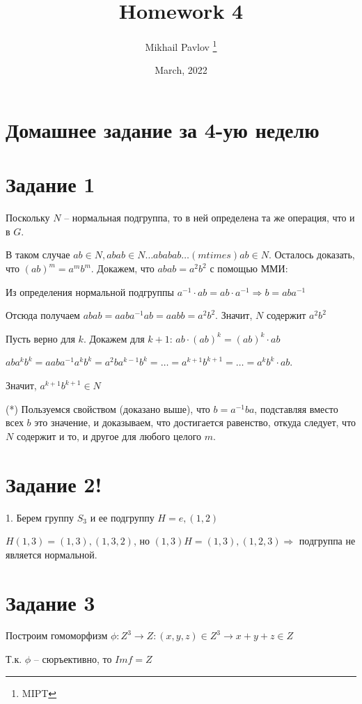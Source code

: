 \documentclass[12pt, a4paper]{article}
\title{Homework 4}
\author{Mikhail Pavlov \thanks{MIPT}}
\date{March, 2022}
\theoremstyle{definition}
\begin{document}
    \section{Домашнее задание за 4-ую неделю}

    \section*{Задание 1}

        Поскольку $N$ -- нормальная подгруппа, то в ней определена та же операция, что и в $G$.

        В таком случае $ab \in N, abab \in N \dots ababab\dots(m times)ab \in N$. Осталось доказать, что $(ab)^m = a^mb^m$.
        Докажем, что $abab = a^2 b^2$ с помощью ММИ:

        Из определения нормальной подгруппы $a^{-1} \cdot ab = ab \cdot a^{-1} \Rightarrow b = aba^{-1}$

        Отсюда получаем $abab = aaba^{-1}ab = aabb = a^{2} b^2$. Значит, $N$ содержит $a^2 b^2$

        Пусть верно для $k$. Докажем для $k + 1$: $ab \cdot (ab)^k = (ab)^k \cdot ab$

        $ab a^k b^k = a aba^{-1} a^k b^k = a^2 b a^{k-1} b^k = \dots = a^{k+1}b^{k+1} = \dots = a^k b^k \cdot ab$.

        Значит, $a^{k+1} b^{k+1} \in N$

    (*) Пользуемся свойством (доказано выше), что $b = a^{-1}ba$, подставляя вместо всех $b$ это значение, и доказываем,
    что достигается равенство, откуда следует, что $N$ содержит и то, и другое для любого целого $m$.

    \section*{Задание 2!}

    1. Берем группу $S_3$ и ее подгруппу $H = {e, (1,2)}$

    $H (1,3) = {(1,3), (1, 3, 2)}$, но $(1,3) H = {(1, 3), (1, 2, 3)} \Rightarrow$ подгруппа не является нормальной.

    \section*{Задание 3}

    Построим гомоморфизм $\phi: Z^3 \rightarrow Z : (x, y, z) \in Z^3 \rightarrow x + y + z \in Z$

    Т.к. $\phi$ -- сюръективно, то $Im f = Z$
\end{document}
